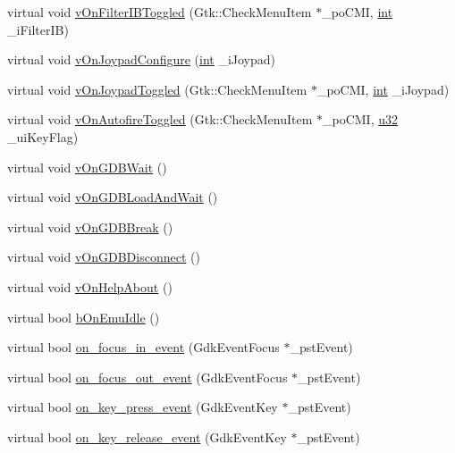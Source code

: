 \begin{DoxyCompactItemize}
\item 
virtual void \mbox{\hyperlink{class_v_b_a_1_1_window_afddc93921e9561601104184bb16941e5}{v\+On\+Filter\+I\+B\+Toggled}} (Gtk\+::\+Check\+Menu\+Item $\ast$\+\_\+po\+C\+MI, \mbox{\hyperlink{_util_8cpp_a0ef32aa8672df19503a49fab2d0c8071}{int}} \+\_\+i\+Filter\+IB)
\item 
virtual void \mbox{\hyperlink{class_v_b_a_1_1_window_a9a72206ce2e6c13d5bd66863292f9515}{v\+On\+Joypad\+Configure}} (\mbox{\hyperlink{_util_8cpp_a0ef32aa8672df19503a49fab2d0c8071}{int}} \+\_\+i\+Joypad)
\item 
virtual void \mbox{\hyperlink{class_v_b_a_1_1_window_a38491fe3a0daf6be7ab610fd282d2e47}{v\+On\+Joypad\+Toggled}} (Gtk\+::\+Check\+Menu\+Item $\ast$\+\_\+po\+C\+MI, \mbox{\hyperlink{_util_8cpp_a0ef32aa8672df19503a49fab2d0c8071}{int}} \+\_\+i\+Joypad)
\item 
virtual void \mbox{\hyperlink{class_v_b_a_1_1_window_a7267bdc270816ef841f3fe1bcfd03f27}{v\+On\+Autofire\+Toggled}} (Gtk\+::\+Check\+Menu\+Item $\ast$\+\_\+po\+C\+MI, \mbox{\hyperlink{_system_8h_a10e94b422ef0c20dcdec20d31a1f5049}{u32}} \+\_\+ui\+Key\+Flag)
\item 
virtual void \mbox{\hyperlink{class_v_b_a_1_1_window_a35c038f07a5ea91103c5e05b82b8bd0b}{v\+On\+G\+D\+B\+Wait}} ()
\item 
virtual void \mbox{\hyperlink{class_v_b_a_1_1_window_a266811d22fbeb400a01d1c2330fb9877}{v\+On\+G\+D\+B\+Load\+And\+Wait}} ()
\item 
virtual void \mbox{\hyperlink{class_v_b_a_1_1_window_add1f8eb55cc9523cfdb6dbc3b9fbf4cf}{v\+On\+G\+D\+B\+Break}} ()
\item 
virtual void \mbox{\hyperlink{class_v_b_a_1_1_window_ad6f454f394ed7265f374e78b2a255cbb}{v\+On\+G\+D\+B\+Disconnect}} ()
\item 
virtual void \mbox{\hyperlink{class_v_b_a_1_1_window_a032219499a0266249033431bc86c559f}{v\+On\+Help\+About}} ()
\item 
virtual bool \mbox{\hyperlink{class_v_b_a_1_1_window_a2ac2bae273728c175c38770da8a9ad8a}{b\+On\+Emu\+Idle}} ()
\item 
virtual bool \mbox{\hyperlink{class_v_b_a_1_1_window_a12b2428d319af7010bbc689193f1b801}{on\+\_\+focus\+\_\+in\+\_\+event}} (Gdk\+Event\+Focus $\ast$\+\_\+pst\+Event)
\item 
virtual bool \mbox{\hyperlink{class_v_b_a_1_1_window_a1153e9927db5e913c4364d507adbfc4b}{on\+\_\+focus\+\_\+out\+\_\+event}} (Gdk\+Event\+Focus $\ast$\+\_\+pst\+Event)
\item 
virtual bool \mbox{\hyperlink{class_v_b_a_1_1_window_a3fc2f454d5b9bbb8a74d44c3ac10655d}{on\+\_\+key\+\_\+press\+\_\+event}} (Gdk\+Event\+Key $\ast$\+\_\+pst\+Event)
\item 
virtual bool \mbox{\hyperlink{class_v_b_a_1_1_window_af7c7628164d393dd278503b1d95298fa}{on\+\_\+key\+\_\+release\+\_\+event}} (Gdk\+Event\+Key $\ast$\+\_\+pst\+Event)
\end{DoxyCompactItemize}
